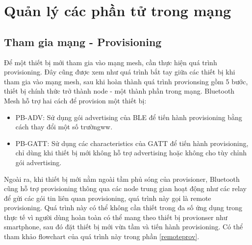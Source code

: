     \section{Quản lý các phần tử trong mạng}
        \subsection{Tham gia mạng - Provisioning}
            Để một thiết bị mới tham gia vào mạng mesh, cần thực hiện quá trình provisioning. Đây cũng được xem như quá trình bắt tay giữa các thiết bị khi tham gia vào mạng mesh, sau khi hoàn thành quá trình provionsing gồm 5 bước, thiết bị chính thức trở thành node - một thành phần trong mạng. Bluetooth Mesh hỗ trợ hai cách để provision một thiết bị:
            \begin{itemize}
                \item PB-ADV: Sử dụng gói advertising của BLE để tiến hành provisioning bằng cách thay đổi một số trườngww.
                \item PB-GATT: Sử dụng các characteristics của GATT để tiến hành provisioning, chỉ dùng khi thiết bị mới không hỗ trợ advertising hoặc không cho tùy chỉnh gói advertising.
            \end{itemize}

            Ngoài ra, khi thiết bị mới nằm ngoài tầm phủ sóng của provisioner, Bluetooth cũng hỗ trợ provisioning thông qua các node trung gian hoạt động như các relay để gửi các gói tin liên quan provisioning, quá trình này gọi là remote provisioning. Quá trình này có thể không cần thiết trong đa số ứng dụng trong thực tế vì người dùng hoàn toàn có thể mang theo thiết bị provionser như smartphone, sau đó đặt thiết bị mới vừa tầm và tiến hành provisioning. Có thể tham khảo flowchart của quá trình này trong phần \ref{remoteprov}.

